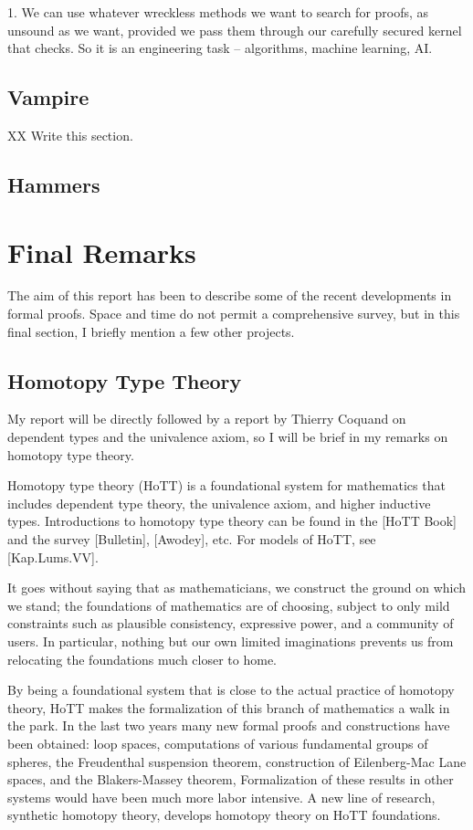 \documentclass[brochure,english,12pt]{bourbaki}
\theoremstyle{plain}
\begin{document}
1. We can use whatever wreckless methods we want to search for proofs, as unsound as we want,
provided we pass them through our carefully secured kernel that checks.
So it is an engineering task -- algorithms, machine learning, AI.

\subsection{Vampire}

XX Write this section.

\subsection{Hammers}





\section{Final Remarks}

The aim of this report has been to describe some of the recent developments in formal proofs.
Space and time do not permit a comprehensive survey, but in this final section, I briefly mention
a few other projects.


\subsection{Homotopy Type Theory}

My report will be directly followed by a report by Thierry Coquand on dependent types and
the univalence axiom, so I will be brief in my remarks on homotopy type theory.

Homotopy type theory (HoTT) is a foundational system for mathematics that includes
dependent type theory, the univalence axiom, and higher inductive types.  
Introductions to homotopy type theory can be found in the [HoTT Book] and the survey [Bulletin], [Awodey], etc.
For models of HoTT, see [Kap.Lums.VV].

It goes without saying that as mathematicians, we construct the ground on which we stand;
the foundations of mathematics are of choosing, subject
to only mild constraints such as plausible consistency, expressive power, and a community of users.
In particular, nothing but our own limited imaginations prevents us from relocating the
foundations much closer to home.

By being a foundational system that is close to the actual practice of homotopy theory,
HoTT makes the formalization of this branch of mathematics a walk in the park.
In the last two years many new formal proofs and constructions have been obtained: 
loop spaces, computations of various
fundamental groups of spheres, the Freudenthal suspension theorem,
construction of Eilenberg-Mac Lane spaces, and the Blakers-Massey theorem,
Formalization of these results in other systems would have been much more labor intensive.
A new line of research, synthetic homotopy theory, develops homotopy theory on HoTT foundations.
\end{document}
